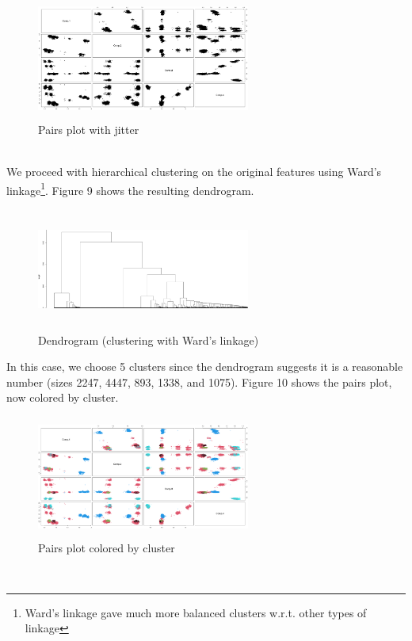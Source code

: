 \documentclass[twoside,twocolumn]{article}
\begin{document}
\begin{figure}[h]
	\caption{Pairs plot with jitter}
	\label{pairsjitter}
	\centering
	\includegraphics[width=70mm, height=40mm]{pairsjitter.png}
\end{figure}\\
We proceed with hierarchical clustering on the original features using Ward's linkage\footnote{Ward's linkage gave much more balanced clusters w.r.t. other types of linkage}. Figure 9 shows the resulting dendrogram.
\begin{figure}[h]
	\caption{Dendrogram (clustering with Ward's linkage)}
	\label{dendrogram}
	\centering
	\includegraphics[width=70mm, height=40mm]{dendrogram.png}
\end{figure}
In this case, we choose 5 clusters since the dendrogram suggests it is a reasonable number (sizes 2247, 4447, 893, 1338, and 1075). Figure 10 shows the pairs plot, now colored by cluster. 
\begin{figure}[h]
	\caption{Pairs plot colored by cluster}
	\label{pairscolored}
	\centering
	\includegraphics[width=70mm, height=40mm]{pairs2.png}
\end{figure}\\
\end{document}
